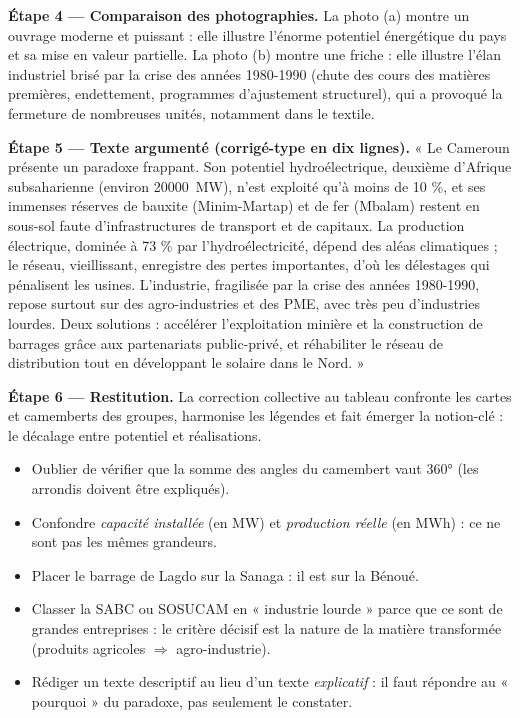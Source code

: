 \documentclass[11pt]{article}
\newcommand{\cle}[1]{{\popxbold\color{popdark}#1}}
\begin{document}
\begin{exoresolu}
\textbf{Étape 4 — Comparaison des photographies.} La photo (a) montre un ouvrage moderne et puissant : elle illustre l'\cle{énorme potentiel énergétique} du pays et sa mise en valeur partielle. La photo (b) montre une friche : elle illustre l'\cle{élan industriel brisé par la crise} des années 1980-1990 (chute des cours des matières premières, endettement, programmes d'ajustement structurel), qui a provoqué la fermeture de nombreuses unités, notamment dans le textile.

\textbf{Étape 5 — Texte argumenté (corrigé-type en dix lignes).} « Le Cameroun présente un paradoxe frappant. Son potentiel hydroélectrique, deuxième d'Afrique subsaharienne (environ \SI{20000}{MW}), n'est exploité qu'à moins de 10 \%, et ses immenses réserves de bauxite (Minim-Martap) et de fer (Mbalam) restent en sous-sol faute d'infrastructures de transport et de capitaux. La production électrique, dominée à 73 \% par l'hydroélectricité, dépend des aléas climatiques ; le réseau, vieillissant, enregistre des pertes importantes, d'où les délestages qui pénalisent les usines. L'industrie, fragilisée par la crise des années 1980-1990, repose surtout sur des agro-industries et des PME, avec très peu d'industries lourdes. Deux solutions : accélérer l'exploitation minière et la construction de barrages grâce aux partenariats public-privé, et réhabiliter le réseau de distribution tout en développant le solaire dans le Nord. »

\textbf{Étape 6 — Restitution.} La correction collective au tableau confronte les cartes et camemberts des groupes, harmonise les légendes et fait émerger la notion-clé : le \cle{décalage entre potentiel et réalisations}.
\end{exoresolu}

\begin{attention}
\begin{itemize}
\item Oublier de vérifier que la somme des angles du camembert vaut 360° (les arrondis doivent être expliqués).
\item Confondre \emph{capacité installée} (en MW) et \emph{production réelle} (en MWh) : ce ne sont pas les mêmes grandeurs.
\item Placer le barrage de Lagdo sur la Sanaga : il est sur la \cle{Bénoué}.
\item Classer la SABC ou SOSUCAM en « industrie lourde » parce que ce sont de grandes entreprises : le critère décisif est la \cle{nature de la matière transformée} (produits agricoles $\Rightarrow$ agro-industrie).
\item Rédiger un texte descriptif au lieu d'un texte \emph{explicatif} : il faut répondre au « pourquoi » du paradoxe, pas seulement le constater.
\end{itemize}
\end{attention}
\end{document}
